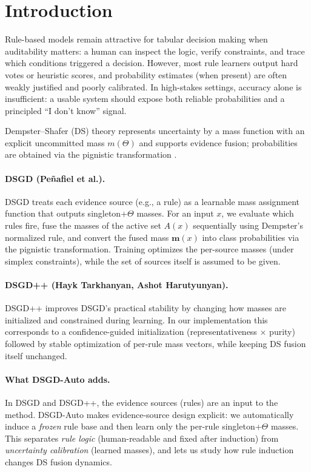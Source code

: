 \documentclass[11pt,a4paper]{article}
\providecommand{\mb}[1]{#1}
\renewcommand{\mb}[1]{\bm{#1}}
\providecommand{\1}{}
\renewcommand{\1}{\mathbbm{1}}
\begin{document}
\section{Introduction}
Rule-based models remain attractive for tabular decision making when auditability matters: a human can inspect the logic, verify constraints, and trace which conditions triggered a decision. However, most rule learners output hard votes or heuristic scores, and probability estimates (when present) are often weakly justified and poorly calibrated. In high-stakes settings, accuracy alone is insufficient: a usable system should expose both reliable probabilities and a principled ``I don't know'' signal.

Dempster--Shafer (DS) theory represents uncertainty by a mass function with an explicit uncommitted mass $m(\Theta)$ and supports evidence fusion; probabilities are obtained via the pignistic transformation \cite{Shafer1976,Smets2005}.

\paragraph{DSGD (Pe\~nafiel et al.).}
DSGD \cite{Penafiel2020} treats each evidence source (e.g., a rule) as a learnable mass assignment function that outputs singleton+$\Theta$ masses.
For an input $x$, we evaluate which rules fire, fuse the masses of the active set $A(x)$ sequentially using Dempster's normalized rule, and convert the fused mass $\mb{m}(x)$ into class probabilities via the pignistic transformation.
Training optimizes the per-source masses (under simplex constraints), while the set of sources itself is assumed to be given.

\paragraph{DSGD++ (Hayk Tarkhanyan, Ashot Harutyunyan).}
DSGD++ \cite{Tarkhanyan2025} improves DSGD's practical stability by changing how masses are initialized and constrained during learning.
In our implementation this corresponds to a confidence-guided initialization (representativeness $\times$ purity) followed by stable optimization of per-rule mass vectors, while keeping DS fusion itself unchanged.

\paragraph{What DSGD-Auto adds.}
In DSGD and DSGD++, the evidence sources (rules) are an input to the method.
DSGD-Auto makes evidence-source design explicit: we automatically induce a \emph{frozen} rule base and then learn only the per-rule singleton+$\Theta$ masses.
This separates \emph{rule logic} (human-readable and fixed after induction) from \emph{uncertainty calibration} (learned masses), and lets us study how rule induction changes DS fusion dynamics.
\end{document}
